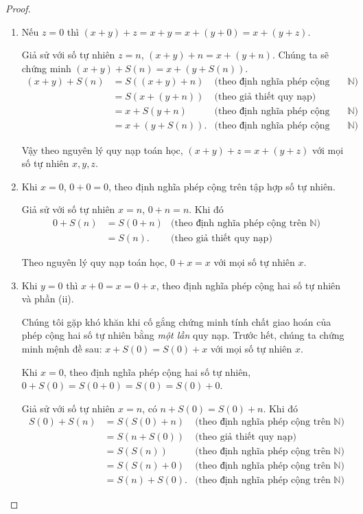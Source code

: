 \begin{proof}
	\begin{enumerate}[label={(\roman*)}]
		\item Nếu $z = 0$ thì $(x + y) + z = x + y = x + (y + 0) = x + (y + z)$.

		      Giả sử với số tự nhiên $z = n$, $(x + y) + n = x + (y + n)$. Chúng ta sẽ chứng minh $(x + y) + S(n) = x + (y + S(n))$.
		      \begin{align*}
			      (x + y) + S(n) & = S((x + y) + n)  & \text{(theo định nghĩa phép cộng trên $\mathbb{N}$)} \\
			                     & = S(x + (y + n))  & \text{(theo giả thiết quy nạp)}                      \\
			                     & = x + S(y + n)    & \text{(theo định nghĩa phép cộng trên $\mathbb{N}$)} \\
			                     & = x + (y + S(n)). & \text{(theo định nghĩa phép cộng trên $\mathbb{N}$)}
		      \end{align*}

		      Vậy theo nguyên lý quy nạp toán học, $(x + y) + z = x + (y + z)$ với mọi số tự nhiên $x, y, z$.
		\item Khi $x = 0$, $0 + 0 = 0$, theo định nghĩa phép cộng trên tập hợp số tự nhiên.

		      Giả sử với số tự nhiên $x = n$, $0 + n = n$. Khi đó
		      \begin{align*}
			      0 + S(n) & = S(0 + n) & \text{(theo định nghĩa phép cộng trên $\mathbb{N}$)} \\
			               & = S(n).    & \text{(theo giả thiết quy nạp)}
		      \end{align*}

		      Theo nguyên lý quy nạp toán học, $0 + x = x$ với mọi số tự nhiên $x$.
		\item Khi $y = 0$ thì $x + 0 = x = 0 + x$, theo định nghĩa phép cộng hai số tự nhiên và phần (ii).

		      Chúng tôi gặp khó khăn khi cố gắng chứng minh tính chất giao hoán của phép cộng hai số tự nhiên bằng \textit{một lần} quy nạp. Trước hết, chúng ta chứng minh mệnh đề sau: $x + S(0) = S(0) + x$ với mọi số tự nhiên $x$.

		      Khi $x = 0$, theo định nghĩa phép cộng hai số tự nhiên, $0 + S(0) = S(0 + 0) = S(0) = S(0) + 0$.

		      Giả sử với số tự nhiên $x = n$, có $n + S(0) = S(0) + n$. Khi đó
		      \begin{align*}
			      S(0) + S(n) & = S(S(0) + n)  & \text{(theo định nghĩa phép cộng trên $\mathbb{N}$)} \\
			                  & = S(n + S(0))  & \text{(theo giả thiết quy nạp)}                      \\
			                  & = S(S(n))      & \text{(theo định nghĩa phép cộng trên $\mathbb{N}$)} \\
			                  & = S(S(n) + 0)  & \text{(theo định nghĩa phép cộng trên $\mathbb{N}$)} \\
			                  & = S(n) + S(0). & \text{(theo định nghĩa phép cộng trên $\mathbb{N}$)}
		      \end{align*}


\end{enumerate}
\end{proof}
